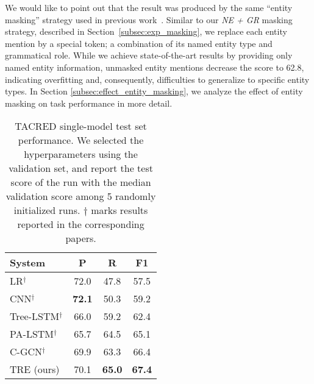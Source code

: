 \documentclass[akbc,twoside,11pt]{article}
\begin{document}
We would like to point out that the result was produced by the same ``entity masking'' strategy used in previous work~\cite{zhang_position_aware_2017, zhang_graphco_2018}. Similar to our \textit{NE + GR} masking strategy, described in Section~\ref{subsec:exp_masking}, we replace each entity mention by a special token; a combination of its named entity type and grammatical role. While we achieve state-of-the-art results by providing only named entity information, unmasked entity mentions decrease the score to 62.8, indicating overfitting and, consequently, difficulties to generalize to specific entity types. In Section \ref{subsec:effect_entity_masking}, we analyze the effect of entity masking on task performance in more detail.

\begin{table}[ht!]
    \centering
    \begin{tabular}{l c c c} \hline
        System & P & R & F1 \\\hline
        LR$^\mathrm{\dagger}$ \citet{zhang_position_aware_2017} & 72.0 & 47.8 & 57.5 \\
CNN$^\mathrm{\dagger}$ \citet{zhang_position_aware_2017} & \textbf{72.1} & 50.3 & 59.2 \\
        Tree-LSTM$^\mathrm{\dagger}$ \citet{zhang_graphco_2018} & 66.0 & 59.2 & 62.4 \\
PA-LSTM$^\mathrm{\dagger}$ \citet{zhang_graphco_2018} & 65.7 & 64.5 & 65.1 \\
        C-GCN$^\mathrm{\dagger}$ \citet{zhang_graphco_2018} & 69.9 & 63.3 & 66.4 \\
        TRE (ours) & 70.1 & \textbf{65.0} & \textbf{67.4} \\\hline
    \end{tabular}
    \caption{TACRED single-model test set performance. We selected the hyperparameters using the validation set, and report the test score of the run with the median validation score among 5 randomly initialized runs. $\mathrm{\dagger}$ marks results reported in the corresponding papers.}
    \label{tab:results_tacred}
\end{table}
\end{document}
